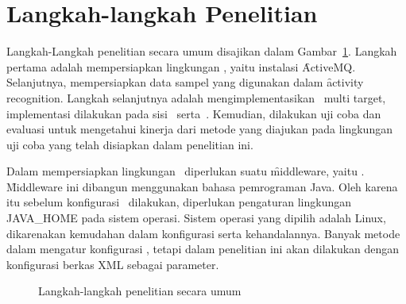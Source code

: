 \section{Langkah-langkah Penelitian}

Langkah-Langkah penelitian secara umum disajikan dalam
Gambar~\ref{fig:langkah}.  Langkah pertama adalah mempersiapkan lingkungan
\pubsub, yaitu instalasi \f{ActiveMQ}.  Selanjutnya, mempersiapkan data sampel
yang digunakan dalam \f{activity recognition}.  Langkah selanjutnya adalah
mengimplementasikan \tracking~multi target, implementasi dilakukan pada sisi
\client~serta~\server. Kemudian, dilakukan uji coba dan evaluasi untuk
mengetahui kinerja dari metode yang diajukan pada lingkungan uji coba yang
telah disiapkan dalam penelitian ini.

Dalam mempersiapkan lingkungan \pubsub~diperlukan suatu \f{middleware}, yaitu
\activemq. \f{Middleware} ini dibangun menggunakan bahasa pemrograman Java.
Oleh karena itu sebelum konfigurasi \activemq~dilakukan, diperlukan pengaturan
lingkungan JAVA\_HOME pada sistem operasi. Sistem operasi yang dipilih adalah
Linux, dikarenakan kemudahan dalam konfigurasi serta kehandalannya. Banyak 
metode dalam mengatur konfigurasi \activemq, tetapi dalam penelitian ini akan
dilakukan dengan konfigurasi berkas XML sebagai parameter.


\begin{figure}
    \centering
    \caption{Langkah-langkah penelitian secara umum}
\label{fig:langkah}
\end{figure}

